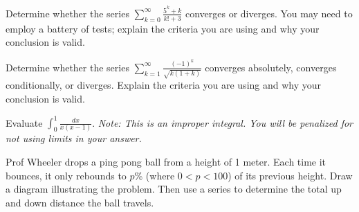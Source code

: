 \documentclass[12pt, addpoints]{exam/exam}
\newcommand{\1}{^{-1}}
\theoremstyle{plain}
\begin{document}
\begin{questions}

\newpage
\question[15] %
Determine whether the series $\sum_{k=0}^{\infty}\frac{5^k+k}{k!+3}$ converges or diverges.  You may need to employ a battery of tests; explain the criteria you are using and why your conclusion is valid.

\newpage
\question[15] %
Determine whether the series $\sum_{k=1}^{\infty}\frac{(-1)^k}{\sqrt{k(1+k)}}$ converges absolutely, converges conditionally, or diverges.  Explain the criteria you are using and why your conclusion is valid.

\newpage
\question[15] %
Evaluate $\int_0^1\frac{dx}{x(x-1)}$.  \textit{Note: This is an improper integral.  You will be penalized for not using limits in your answer.}

\newpage
\question[15] %
Prof Wheeler drops a ping pong ball from a height of 1 meter.  Each time it bounces, it only rebounds to $p$\% (where $0<p<100$) of its previous height.  Draw a diagram illustrating the problem.  Then use a series to determine the total up and down distance the ball travels.

\end{questions}
\end{document}
